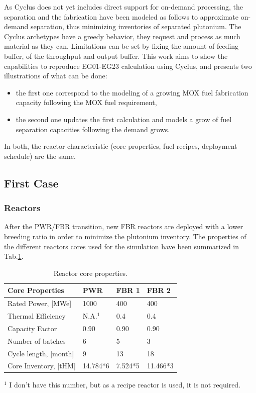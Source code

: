 \documentclass[12pt]{article}
\begin{document}
As Cyclus does not yet includes direct support for
on-demand processing, the separation and the
fabrication have been modeled as follows to
approximate on-demand separation, thus minimizing
inventories of separated plutonium.
The Cyclus archetypes have a greedy behavior, they
request and process as much material as they can.
Limitations can be set by fixing the amount of
feeding buffer, of the throughput and output
buffer.
This work aims to show the capabilities to
reproduce EG01-EG23 calculation using Cyclus, and
presents two illustrations of what can be done:
\begin{itemize}
\item the first one correspond to the modeling
of a growing MOX fuel fabrication capacity
following the MOX fuel requirement,
\item the second one updates the first calculation and
models a grow of fuel separation capacities
following the demand grows.
\end{itemize}
In both, the reactor characteristic (core
properties, fuel recipes, deployment schedule) are
the same.

\subsection{First Case}
\subsubsection{Reactors}
After the PWR/FBR transition, new FBR reactors are
deployed with a lower breeding ratio in order to
minimize the plutonium inventory. The properties
of the different reactors cores used for the
simulation have been summarized in
Tab.\ref{tab:reactor}.\\
\begin{table}[h!]
\centering
\begin{tabularx}{350pt}{lXXX}
\hline
Core Properties       &	PWR     &	FBR 1   &	FBR 2     \\
\hline
Rated Power, [MWe]    &	1000		&	400     &	400       \\
Thermal Efficiency    &	N.A.$^1$	&	0.4     &	0.4       \\
Capacity Factor       &	0.90		&	0.90		&	0.90      \\
Number of batches     &	6       &	5       &	3         \\
Cycle length, [month] &	9       &	13      &	18        \\
Core Inventory, [tHM] &	14.784*6&	7.524*5	&	11.466*3  \\
\hline
\end{tabularx}
\caption{Reactor core properties.}
\label{tab:reactor}
\footnotesize{$^1$ I don't have this number, but as a recipe reactor is used, it is not required.}
\end{table}
\end{document}
